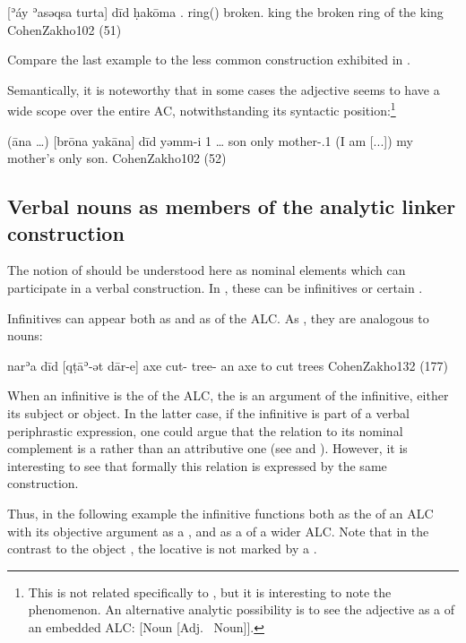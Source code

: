 {[ʾáy ʾasəqsa turta] dīd ḥakōma}
{.\fem{} ring(\fem) broken.\fem{} \lnkd{} king}
{the broken ring of the king}
{CohenZakho}{102 (51)}

Compare the last example to the less common construction exhibited in .

Semantically, it is noteworthy that in some cases the adjective seems to have a wide scope over the entire AC, notwithstanding its syntactic position:\footnote{This is not related specifically to \JZax, but it is interesting to note the phenomenon. An alternative analytic possibility is to see the adjective as a \prim of an embedded ALC: [Noun [Adj. \lnk\ Noun]].}

{(āna \ldots ) [brōna yakāna] dīd yəmm-i}
{1\sg{} \ldots{} son only \lnkd{} mother-\poss.1\sg}  
{(I am [...]) my mother's only son.}
{CohenZakho}{102 (52)}




\subsection[Verbal nouns as members of the ALC]{Verbal nouns as members of the analytic linker construction} \label{ss:JZax_VerbalNouns_heads}

The notion of  should be understood here as nominal elements which can participate in a verbal construction. In \JZax, these can be infinitives or certain . 

Infinitives can  appear both as \prims and as \secns of the ALC. As \secns, they are analogous to nouns:

{narʾa dīd [qṭāʾ-ət dār-e]}
{axe \lnkd{} cut-\cst{} tree-\pl}
{an axe to cut trees}
{CohenZakho}{132 (177)}

\largerpage
When an infinitive is the \prim of the ALC, the \secn is an argument of the infinitive, either its subject or object.  In the latter case, if the infinitive is part of a verbal periphrastic expression, one could argue that the relation to its nominal complement is a  rather than an attributive one (see  and \cite[cf.][100]{CohenZakho}). However, it is interesting to see that formally this relation is expressed by the same construction. 



Thus, in the following example the infinitive  functions both as the \prim of an ALC with its objective argument as a \secn, and as a \secn of a wider ALC. Note that in the contrast to the object , the locative    is not marked by a \lnk*.

